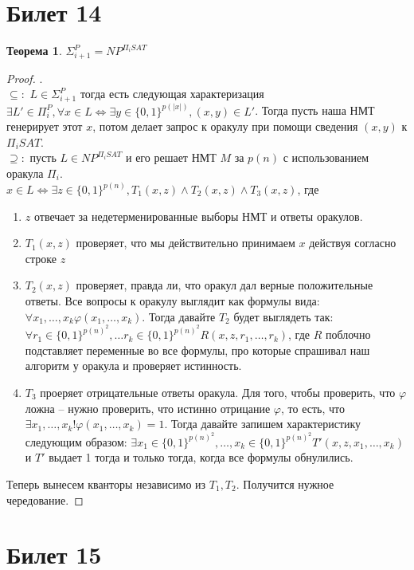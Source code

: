 \documentclass[12pt, letterpaper]{article}
\newtheorem{theorem}{Теорема}[section]
\newcommand{\ph}{\varphi}
\begin{document}
\section{Билет 14}
\begin{theorem}
$\Sigma_{i+1}^P = NP^{\Pi_i SAT}$
\end{theorem}
\begin{proof}
.\\$\subseteq:$ $L \in \Sigma_{i+1}^P$ тогда есть следующая характеризация $\exists L' \in \Pi_i^P, \forall x \in L \Leftrightarrow \exists y \in \{0, 1\}^{p(|x|)}, (x, y) \in L'$. Тогда пусть наша НМТ генерирует этот $x$, потом делает запрос к оракулу при помощи сведения $(x, y)$ к $\Pi_i SAT$. \\
$\supseteq:$ пусть $L \in NP^{\Pi_i SAT}$ и его решает НМТ $M$ за $p(n)$ с использованием оракула $\Pi_i$. \\
$x \in L \Longleftrightarrow \exists z \in \{0,1\}^{p(n)}, T_1(x, z) \wedge T_2(x, z) \wedge T_3(x, z) $, где
\begin{enumerate}
\item $z$ отвечает за недетерменированные выборы НМТ и ответы оракулов.
\item $T_1(x, z)$ проверяет, что мы действительно принимаем $x$ действуя согласно строке $z$
\item $T_2(x, z)$ проверяет, правда ли, что оракул дал верные положительные ответы. Все вопросы к оракулу выглядит как формулы вида: $\forall x_1, \ldots, x_k \ph(x_1, \ldots, x_k)$. Тогда давайте $T_2$ будет выглядеть так: $\forall r_1 \in \{0,1\}^{p(n)^2}, \ldots r_k \in \{0, 1\}^{p(n)^2} R(x, z, r_1, \ldots, r_k)$, где $R$ поблочно подставляет переменные во все формулы, про которые спрашивал наш алгоритм у оракула и проверяет истинность.
\item $T_3$ проеряет отрицательные ответы оракула. Для того, чтобы проверить, что $\ph$ ложна -- нужно проверить, что истинно отрицание $\ph$, то есть, что $\exists x_1, \ldots, x_k !\ph(x_1, \ldots, x_k) = 1$. Тогда давайте запишем характеристику следующим образом: 
$\exists x_1 \in \{0,1\}^{p(n)^2}, \ldots, x_k \in \{0, 1\}^{p(n)^2} T'(x, z, x_1, \ldots, x_k)$ и $T'$ выдает 1 тогда и только тогда, когда все формулы обнулились. 
\end{enumerate}
Теперь вынесем кванторы независимо из $T_1, T_2$. Получится нужное чередование. 
\end{proof}

\section{Билет 15}
\end{document}
